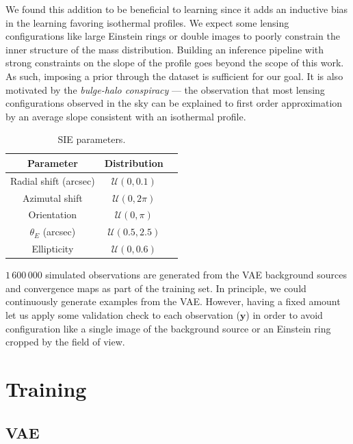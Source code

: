\documentclass[twocolumn]{aastex631}
\begin{document}
We found this addition to be beneficial to learning since it adds an 
inductive bias in the learning favoring isothermal profiles.
We expect some lensing configurations like 
large Einstein rings or double images to poorly constrain the inner structure of the 
mass distribution. Building an inference pipeline with strong constraints on the 
slope of the profile goes beyond the scope of this work. As such, imposing a prior through 
the dataset is sufficient for our goal. It is also motivated by the \textit{bulge-halo conspiracy} --- 
the observation that most lensing configurations observed in the sky can be explained 
to first order approximation by 
an average slope consistent with an isothermal profile.

\begin{table}[ht!]
\centering
\caption{SIE parameters.}
\label{tab:sie}
\begin{tabular}{ccc}
        Parameter &  Distribution \\
        \hline \hline
         Radial shift (arcsec) & $\mathcal{U}(0, 0.1)$ \\
        Azimutal shift & $\mathcal{U}(0, 2\pi)$ \\
        Orientation & $\mathcal{U}(0, \pi)$ \\
        $\theta_E$ (arcsec) & $\mathcal{U}(0.5, 2.5)$ \\
        Ellipticity & $\mathcal{U}(0, 0.6)$ \\
        \hline
\end{tabular}
\end{table}


$1\,600\,000$ simulated observations are generated from the VAE 
background sources and convergence maps as part of the training set. 
In principle, we could continuously generate examples from the VAE. 
However, having a fixed amount let us apply some validation check to each 
observation ($\mathbf{y}$) in order to avoid configuration like a
single image of the background 
source or an Einstein ring cropped by the field of view.


\section{Training}\label{sec:training}



\subsection{VAE}\label{sec:vae training}
\end{document}
